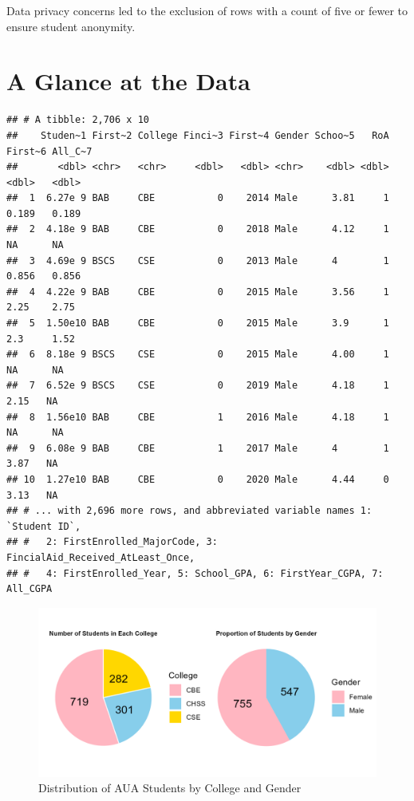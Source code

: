 \documentclass[
  12pt,
]{article}
\begin{document}
Data privacy concerns led to the exclusion of rows with a count of five
or fewer to ensure student anonymity.

\section{A Glance at the Data}\label{a-glance-at-the-data}

\begin{verbatim}
## # A tibble: 2,706 x 10
##    Studen~1 First~2 College Finci~3 First~4 Gender Schoo~5   RoA First~6 All_C~7
##       <dbl> <chr>   <chr>     <dbl>   <dbl> <chr>    <dbl> <dbl>   <dbl>   <dbl>
##  1  6.27e 9 BAB     CBE           0    2014 Male      3.81     1   0.189   0.189
##  2  4.18e 9 BAB     CBE           0    2018 Male      4.12     1  NA      NA    
##  3  4.69e 9 BSCS    CSE           0    2013 Male      4        1   0.856   0.856
##  4  4.22e 9 BAB     CBE           0    2015 Male      3.56     1   2.25    2.75 
##  5  1.50e10 BAB     CBE           0    2015 Male      3.9      1   2.3     1.52 
##  6  8.18e 9 BSCS    CSE           0    2015 Male      4.00     1  NA      NA    
##  7  6.52e 9 BSCS    CSE           0    2019 Male      4.18     1   2.15   NA    
##  8  1.56e10 BAB     CBE           1    2016 Male      4.18     1  NA      NA    
##  9  6.08e 9 BAB     CBE           1    2017 Male      4        1   3.87   NA    
## 10  1.27e10 BAB     CBE           0    2020 Male      4.44     0   3.13   NA    
## # ... with 2,696 more rows, and abbreviated variable names 1: `Student ID`,
## #   2: FirstEnrolled_MajorCode, 3: FincialAid_Received_AtLeast_Once,
## #   4: FirstEnrolled_Year, 5: School_GPA, 6: FirstYear_CGPA, 7: All_CGPA
\end{verbatim}

\newpage

\begin{figure}
\includegraphics[width=0.8\linewidth]{combined_plot} \caption{Distribution of AUA Students by College and Gender}\label{fig:unnamed-chunk-5}
\end{figure}
\end{document}

